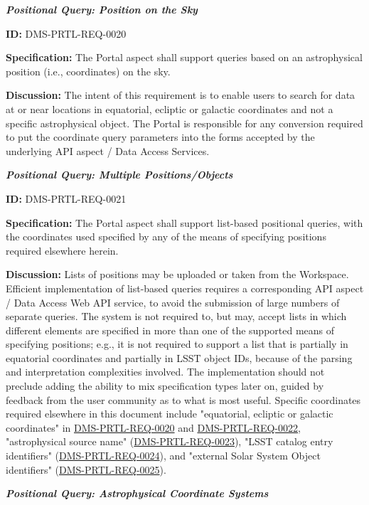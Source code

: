 \documentclass[SE,toc]{lsstdoc}
\begin{document}
\textbf{\textit{Positional Query: Position on the Sky}}

\label{DMS-PRTL-REQ-0020}
\textbf{ID:} DMS-PRTL-REQ-0020

\textbf{Specification:}
The Portal aspect shall support queries based on an astrophysical position (i.e., coordinates) on the sky.

\textbf{Discussion:}
The intent of this requirement is to enable users to search for data at or near locations in equatorial, ecliptic or galactic coordinates and not a specific astrophysical object.
The Portal is responsible for any conversion required to put the coordinate query parameters into the forms accepted by the underlying API aspect / Data Access Services.

\textbf{\textit{Positional Query: Multiple Positions/Objects}}

\label{DMS-PRTL-REQ-0021}
\textbf{ID:} DMS-PRTL-REQ-0021

\textbf{Specification:}
The Portal aspect shall support list-based positional queries, with the coordinates used specified by any of the means of specifying positions required elsewhere herein.

\textbf{Discussion:}
Lists of positions may be uploaded or taken from the Workspace.  Efficient implementation of list-based queries requires a corresponding API aspect / Data Access Web API service, to avoid the submission of large numbers of separate queries.
The system is not required to, but may, accept lists in which different elements are specified in more than one of the supported means of specifying positions; e.g., it is not required to support a list that is partially in equatorial coordinates and partially in LSST object IDs, because of the parsing and interpretation complexities involved.  The implementation should not preclude adding the ability to mix specification types later on, guided by feedback from the user community as to what is most useful.
Specific coordinates required elsewhere in this document include "equatorial, ecliptic or galactic coordinates" in \hyperref[DMS-PRTL-REQ-0020]{DMS-PRTL-REQ-0020} and \hyperref[DMS-PRTL-REQ-0022]{DMS-PRTL-REQ-0022}, "astrophysical source name" (\hyperref[DMS-PRTL-REQ-0023]{DMS-PRTL-REQ-0023}), "LSST catalog entry identifiers" (\hyperref[DMS-PRTL-REQ-0024]{DMS-PRTL-REQ-0024}), and "external Solar System Object identifiers" (\hyperref[DMS-PRTL-REQ-0025]{DMS-PRTL-REQ-0025}).

\textbf{\textit{Positional Query: Astrophysical Coordinate Systems}}
\end{document}
